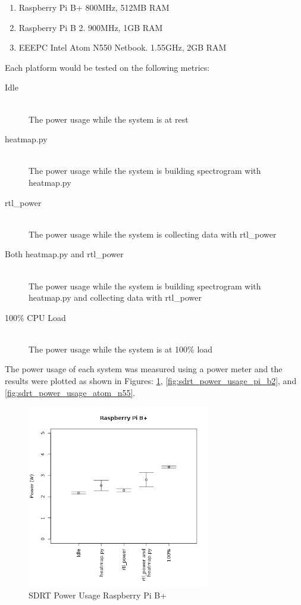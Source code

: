 \documentclass[runningheads,a4paper]{llncs}
\begin{document}
\begin{enumerate}
	\item Raspberry Pi B+ 800MHz, 512MB RAM
	\item Raspberry Pi B 2. 900MHz, 1GB RAM
	\item EEEPC Intel Atom N550 Netbook. 1.55GHz, 2GB RAM
\end{enumerate}

Each platform would be tested on the following metrics:

\begin{description}
	\item [Idle] \hfil \\
	The power usage while the system is at rest
	\item [heatmap.py] \hfill \\ 
	The power usage while the system is building spectrogram with heatmap.py
	\item [rtl\_power] \hfill \\
	The power usage while the system is collecting data with rtl\_power
	\item [Both heatmap.py and rtl\_power] \hfill \\
	The power usage while the system is building spectrogram with heatmap.py and collecting data with rtl\_power
	\item [100\% CPU Load] \hfill \\
	The power usage while the system is at 100\% load
\end{description}


The power usage of each system was measured using a power meter and the results were plotted as shown in Figures: \ref{fig:sdrt_power_usage_pi_b}, \ref{fig:sdrt_power_usage_pi_b2}, and \ref{fig:sdrt_power_usage_atom_n55}.

%
\begin{figure}[!htb]
	\centering
	\includegraphics[width=8cm]{images/59}
	\caption{SDRT Power Usage Raspberry Pi B+}
	\label{fig:sdrt_power_usage_pi_b}
\end{figure}
%
\end{document}
